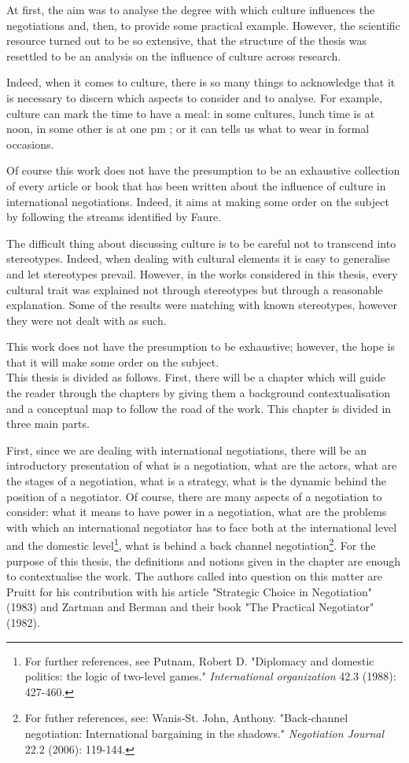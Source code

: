 ﻿\documentclass[../main.tex]{subfiles}
\begin{document}
At first, the aim was to analyse the degree with which culture influences the negotiations and, then, to provide some practical example. However, the scientific resource turned out to be so extensive, that the structure of the thesis was resettled to be an analysis on the influence of culture across research.

Indeed, when it comes to culture, there is so many things to acknowledge that it is necessary to discern which aspects to consider and to analyse. For example, culture can mark the time to have a meal: in some cultures, lunch time is at noon, in some other is at one pm \autocite[7]{helen}; or it can tells us what to wear in formal occasions.

Of course this work does not have the presumption to be an exhaustive collection of every article or book that has been written about the influence of culture in international negotiations. Indeed, it aims at making some order on the subject by following the streams identified by Faure.

The difficult thing about discussing culture is to be careful not to transcend into stereotypes. Indeed, when dealing with cultural elements it is easy to generalise and let stereotypes prevail. However, in the works considered in this thesis, every cultural trait was explained not through stereotypes but through a reasonable explanation. Some of the results were matching with known stereotypes, however they were not dealt with as such. 

This work does not have the presumption to be exhaustive; however, the hope is that it will make some order on the subject.\\

This thesis is divided as follows. First, there will be a chapter which will guide the reader through the chapters by giving them a background contextualisation and a  conceptual map to follow the road of the work. 
This chapter is divided in three main parts.

First, since we are dealing with international negotiations, there will be an introductory presentation of what is a negotiation, what are the actors, what are the stages of a negotiation, what is a strategy, what is the dynamic behind the position of a negotiator. Of course, there are many aspects of a negotiation to consider: what it means to have power in a negotiation, what are the problems with which an international negotiator has to face both at the international level and the domestic level\footnote{For further references, see Putnam, Robert D. "Diplomacy and domestic politics: the logic of two-level games." \textit{International organization} 42.3 (1988): 427-460.}, what is behind a back channel negotiation\footnote{For futher references, see: Wanis‐St. John, Anthony. "Back‐channel negotiation: International bargaining in the shadows." \textit{Negotiation Journal} 22.2 (2006): 119-144.}.
For the purpose of this thesis, the definitions and notions given in the chapter are enough to contextualise the work.
The authors called into question on this matter are Pruitt for his contribution with his article "Strategic Choice in Negotiation" (1983) and Zartman and Berman and their book "The Practical Negotiator" (1982).
\end{document}
